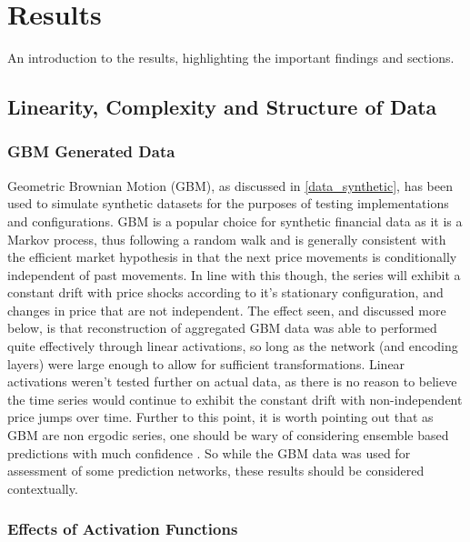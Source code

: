 \documentclass[a4paper,11pt,oneside]{article}
\theoremstyle{plain}
\theoremstyle{definition}
\begin{document}
\newpage
\section{Results}\label{Results}


An introduction to the results, highlighting the important findings and sections. \todo{}


\subsection{Linearity, Complexity and Structure of Data}\label{results_linearity}

\subsubsection{GBM Generated Data}\label{results_gbm_data}

Geometric Brownian Motion (GBM), as discussed in \ref{data_synthetic}, has been used to simulate synthetic datasets for the purposes of testing implementations and configurations. GBM is a popular choice for synthetic financial data as it is a Markov process, thus following a random walk and is generally consistent with the efficient market hypothesis in that the next price movements is conditionally independent of past movements. In line with this though, the series will exhibit a constant drift with price shocks according to it's stationary configuration, and changes in price that are not independent. The effect seen, and discussed more below, is that reconstruction of aggregated GBM data was able to performed quite effectively through linear activations, so long as the network (and encoding layers) were large enough to allow for sufficient transformations. Linear activations weren't tested further on actual data, as there is no reason to believe the time series would continue to exhibit the constant drift with non-independent price jumps over time. Further to this point, it is worth pointing out that as GBM are non ergodic series, one should be wary of considering ensemble based predictions with much confidence \cite{Peters}. So while the GBM data was used for assessment of some prediction networks, these results should be considered contextually.

\subsubsection{Effects of Activation Functions}
\end{document}
